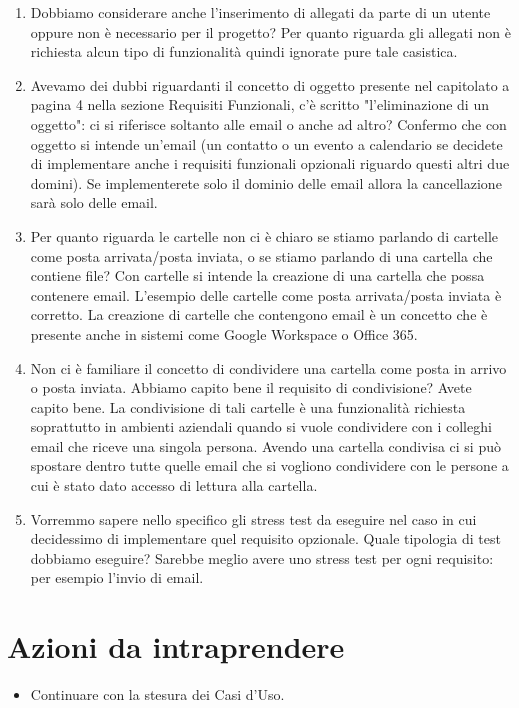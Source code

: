 \documentclass[12pt]{article}
\begin{document}
    \begin{enumerate}[label=\textbf{Q\arabic*:}]
        \item Dobbiamo considerare anche l'inserimento di allegati da parte di un utente oppure non è necessario per il progetto?
        \answer Per quanto riguarda gli allegati non è richiesta alcun tipo di funzionalità quindi ignorate pure tale casistica.

        \item Avevamo dei dubbi riguardanti il concetto di oggetto presente nel capitolato a pagina 4 nella sezione Requisiti Funzionali, c'è scritto "l’eliminazione di un oggetto": ci si riferisce soltanto alle email o anche ad altro?
        \answer Confermo che con oggetto si intende un'email (un contatto o un evento a calendario se decidete di implementare anche i requisiti funzionali opzionali riguardo questi altri due domini). Se implementerete solo il dominio delle email  allora la cancellazione sarà solo delle email.

        \item Per quanto riguarda le cartelle non ci è chiaro se stiamo parlando di cartelle come posta arrivata/posta inviata, o se stiamo parlando di una cartella che contiene file?
        \answer Con cartelle si intende la creazione di una cartella che possa contenere email. L'esempio delle cartelle come posta arrivata/posta inviata è corretto. La creazione di cartelle che contengono email è un concetto che è presente anche in sistemi come Google Workspace o Office 365.

        \item Non ci è familiare il concetto di condividere una cartella come posta in arrivo o posta inviata. Abbiamo capito bene il requisito di condivisione?
        \answer Avete capito bene. La condivisione di tali cartelle è una funzionalità richiesta soprattutto in ambienti aziendali quando si vuole condividere con i colleghi email che riceve una singola persona.  Avendo una cartella condivisa ci si può spostare dentro tutte quelle email che si vogliono condividere con le persone a cui è stato dato accesso di lettura alla cartella.

        \item Vorremmo sapere nello specifico gli stress test da eseguire nel caso in cui decidessimo di implementare quel requisito opzionale. Quale tipologia di test dobbiamo eseguire? 
        \answer Sarebbe meglio avere uno stress test per ogni requisito: per esempio l'invio di email.
    \end{enumerate}
    
    \section{Azioni da intraprendere}
        \begin{itemize}
            \item Continuare con la stesura dei Casi d'Uso.
    	\end{itemize}
\end{document}
